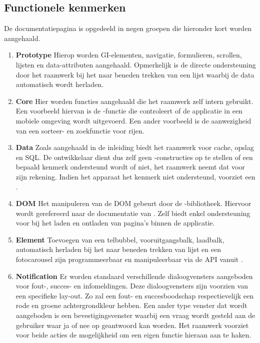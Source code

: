 \subsection{Functionele kenmerken}
De documentatiepagina is opgedeeld in negen groepen die hieronder kort worden aangehaald.

\begin{enumerate}

\item \textbf{Prototype} 
Hierop worden GI-elementen, navigatie, formulieren, scrollen, lijsten en data-attributen aangehaald. 
Opmerkelijk is de directe ondersteuning door het raamwerk bij het naar beneden trekken van een lijst waarbij de data automatisch wordt herladen.

\item \textbf{Core }
Hier worden functies aangehaald die het raamwerk zelf intern gebruikt.
Een voorbeeld hiervan is de -functie die controleert of de applicatie in een mobiele omgeving wordt uitgevoerd.
Een ander voorbeeld is de aanwezigheid van een sorteer- en zoekfunctie voor rijen.

\item \textbf{Data }
Zoals aangehaald in de inleiding biedt het raamwerk  voor cache, opslag en SQL.
De ontwikkelaar dient dus zelf geen -constructies op te stellen of een bepaald kenmerk ondersteund wordt of niet, het raamwerk neemt dat voor zijn rekening.
Indien het apparaat het kenmerk niet ondersteund, voorziet \lungo{} een .

\item \textbf{DOM }
Het manipuleren van de DOM gebeurt door de \quo{}-bibliotheek.
Hiervoor wordt gerefereerd naar de documentatie van \quo{}.
Zelf biedt \lungo{} enkel ondersteuning voor  bij het laden en ontladen van pagina's binnen de applicatie.

\item \textbf{Element }
Toevoegen van een telbubbel, vooruitgangsbalk, laadbalk, automatisch herladen bij het naar beneden trekken van lijst en een fotocarousel zijn programmeerbaar en manipuleerbaar via de \lungo{} API vanuit \js{}. 

\item \textbf{Notification }
Er worden standaard verschillende dialoogvensters aangeboden voor fout-, succes- en infomeldingen.
Deze dialoogvensters zijn voorzien van een specifieke lay-out.
Zo zal een fout- en succesboodschap respectievelijk een rode en groene achtergrondkleur hebben.
Een ander type venster dat wordt aangeboden is een bevestigingsvenster waarbij een vraag wordt gesteld aan de gebruiker waar ja of nee op geantwoord kan worden.
Het raamwerk voorziet voor beide acties de mogelijkheid om een eigen functie hieraan aan te haken.
 

\end{enumerate}

